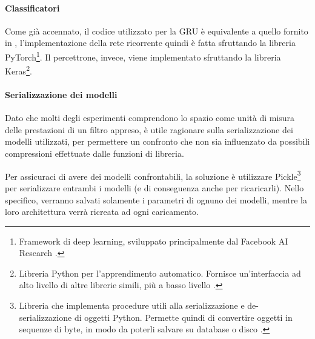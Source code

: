 \documentclass[../../main.tex]{subfiles}
\begin{document}
    \paragraph{Classificatori}
    Come già accennato, il codice utilizzato per la GRU è equivalente a quello fornito in \cite{ma2020}, l'implementazione della rete ricorrente quindi è fatta sfruttando la libreria PyTorch\footnote{Framework di deep learning, sviluppato principalmente dal Facebook AI Research \cite{PyTorch}.}. Il percettrone, invece, viene implementato sfruttando la libreria Keras\footnote{Libreria Python per l'apprendimento automatico. Fornisce un'interfaccia ad alto livello di altre librerie simili, più a basso livello \cite{Keras}.}.

    \paragraph{Serializzazione dei modelli}
    Dato che molti degli esperimenti comprendono lo spazio come unità di misura delle prestazioni di un filtro appreso, è utile ragionare sulla serializzazione dei modelli utilizzati, per permettere un confronto che non sia influenzato da possibili compressioni effettuate dalle funzioni di libreria.

    Per assicuraci di avere dei modelli confrontabili, la soluzione è utilizzare Pickle\footnote{Libreria che implementa procedure utili alla serializzazione e de-serializzazione di oggetti Python. Permette quindi di convertire oggetti in sequenze di byte, in modo da poterli salvare su database o disco \cite{Pickle}.} per serializzare entrambi i modelli (e di conseguenza anche per ricaricarli). Nello specifico, verranno salvati solamente i parametri di ognuno dei modelli, mentre la loro architettura verrà ricreata ad ogni caricamento.
    
\end{document}
